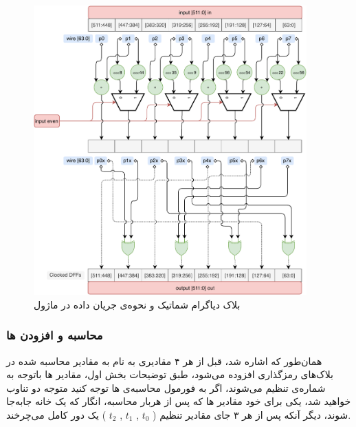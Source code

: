 \begin{figure}[H]
	\centering
	\includegraphics[width=10.5cm]{Images/VerilogDocumentation/diagrams_round4.pdf}	
	\caption{
		بلاک دیاگرام شماتیک و نحوه‌ی جریان داده در ماژول 
	}
\end{figure}

\subsubsection{
	محاسبه و افزودن 
	ها
}
همان‌طور که اشاره شد، قبل از هر ۴
مقادیری به نام 
به مقادیر محاسبه شده در بلاک‌های رمزگذاری افزوده می‌شود، طبق توضیحات بخش اول، مقادیر 
‌ها باتوجه به شماره‌ی
تنظیم می‌شوند، اگر به فورمول محاسبه‌ی 
ها توجه کنید
متوجه دو تناوب خواهید شد، یکی برای خود مقادیر 
ها که پس از هر‌بار محاسبه‌، انگار که یک خانه جا‌به‌جا شوند، دیگر آنکه پس از هر‌ ۳ 
جای مقادیر تنظیم
(
$t_0$ , $t_1$ , $t_2$
)
یک دور کامل می‌چرخند.


